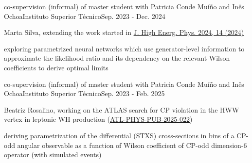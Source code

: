 
\begin{cventries}
    {co-supervision (informal) of master student with Patricia Conde Muíño and Inês Ochoa}{Instituto Superior Técnico}{Sep. 2023 - Dec. 2024}
    {
        \begin{cvitems}
            \item {Marta Silva, extending the work started in \href{https://doi.org/10.1007/JHEP04(2024)014}{J. High Energ. Phys. 2024, 14 (2024)}}
            \item {exploring parametrized neural networks which use generator-level information to approximate the likelihood ratio and its dependency on the relevant Wilson coefficients to derive optimal limits}
        \end{cvitems}
    }

    {co-supervision (informal) of master student with Patricia Conde Muíño and Inês Ochoa}{Instituto Superior Técnico}{Sep. 2023 - Feb. 2025}
    {
        \begin{cvitems}
            \item {Beatriz Rosalino, working on the ATLAS search for CP violation in the HWW vertex in leptonic WH production (\href{https://atlas.web.cern.ch/Atlas/GROUPS/PHYSICS/PUBNOTES/ATL-PHYS-PUB-2025-022/}{ATL-PHYS-PUB-2025-022})}
            \item {deriving parametrization of the differential (STXS) cross-sections in bins of a CP-odd angular observable as a function of Wilson coefficient of CP-odd dimension-6 operator (with simulated events)}
        \end{cvitems}
    }

\end{cventries}